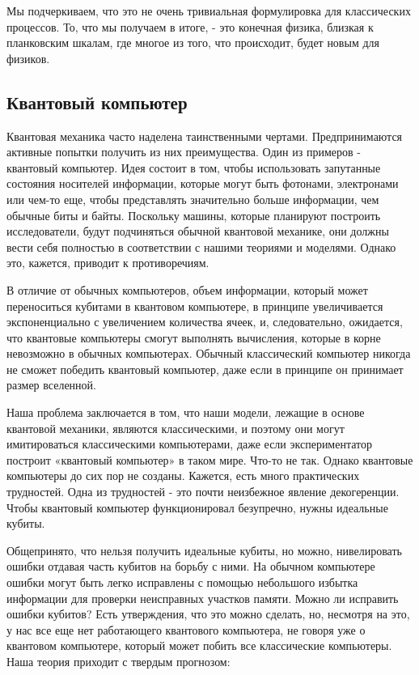 \documentclass[main.tex]{subfiles}
\begin{document}
Мы подчеркиваем, что это не очень тривиальная формулировка для классических процессов. То, что мы получаем в итоге, - это конечная физика, близкая к планковским шкалам, где многое из того, что происходит, будет новым для физиков.


\subsection{Квантовый компьютер}\label{ch5.8}

Квантовая механика часто наделена таинственными чертами. Предпринимаются активные попытки получить из них преимущества. Один из примеров - квантовый компьютер. Идея состоит в том, чтобы использовать запутанные состояния носителей информации, которые могут быть фотонами, электронами или чем-то еще, чтобы представлять значительно больше информации, чем обычные биты и байты.
Поскольку машины, которые планируют построить исследователи, будут подчиняться обычной квантовой механике, они должны вести себя полностью в соответствии с нашими теориями и моделями. Однако это, кажется, приводит к противоречиям.

В отличие от обычных компьютеров, объем информации, который может переноситься кубитами в квантовом компьютере, в принципе увеличивается экспоненциально с увеличением количества ячеек, и, следовательно, ожидается, что квантовые компьютеры смогут выполнять вычисления, которые в корне невозможно в обычных компьютерах. Обычный классический компьютер никогда не сможет победить квантовый компьютер, даже если в принципе он принимает размер вселенной. 

Наша проблема заключается в том, что наши модели, лежащие в основе квантовой механики, являются классическими, и поэтому они могут имитироваться классическими компьютерами, даже если экспериментатор построит «квантовый компьютер» в таком мире. Что-то не так.
Однако квантовые компьютеры до сих пор не созданы. Кажется, есть много практических трудностей. Одна из трудностей - это почти неизбежное явление декогеренции. Чтобы квантовый компьютер функционировал безупречно, нужны идеальные кубиты.

Общепринято, что нельзя получить идеальные кубиты, но можно, нивелировать ошибки отдавая часть кубитов на борьбу с ними. На обычном компьютере ошибки могут быть легко исправлены с помощью небольшого избытка информации для проверки неисправных участков памяти. Можно ли исправить ошибки кубитов? Есть утверждения, что это можно сделать, но, несмотря на это, у нас все еще нет работающего квантового компьютера, не говоря уже о квантовом компьютере, который может побить все классические компьютеры. Наша теория приходит с твердым прогнозом:
\end{document}
